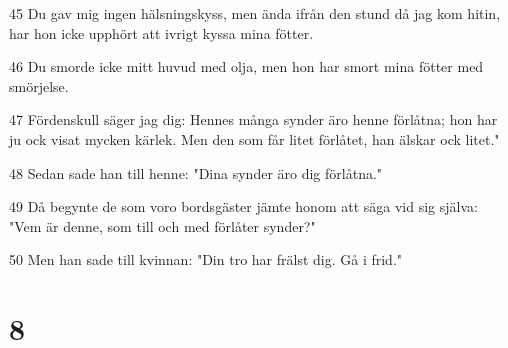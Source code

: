 \par 45 Du gav mig ingen hälsningskyss, men ända ifrån den stund då jag kom hitin, har hon icke upphört att ivrigt kyssa mina fötter.
\par 46 Du smorde icke mitt huvud med olja, men hon har smort mina fötter med smörjelse.
\par 47 Fördenskull säger jag dig: Hennes många synder äro henne förlåtna; hon har ju ock visat mycken kärlek. Men den som får litet förlåtet, han älskar ock litet."
\par 48 Sedan sade han till henne: "Dina synder äro dig förlåtna."
\par 49 Då begynte de som voro bordsgäster jämte honom att säga vid sig själva: "Vem är denne, som till och med förlåter synder?"
\par 50 Men han sade till kvinnan: "Din tro har frälst dig. Gå i frid."

\chapter{8}

